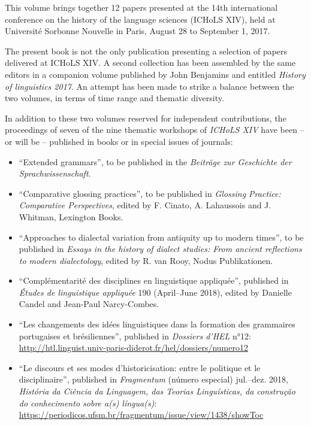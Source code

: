 \begin{refsection}

This volume brings together 12 papers presented at the 14th international conference on the history of the language sciences (ICHoLS XIV), held at Université Sorbonne Nouvelle in Paris, August 28 to September 1, 2017.

The present book is not the only publication presenting a selection of papers delivered at ICHoLS XIV. A second collection has been assembled by the same editors in a companion volume published by John Benjamins and entitled \emph{History of linguistics 2017}. An attempt has been made to strike a balance between the two volumes, in terms of time range and thematic diversity.

In addition to these two volumes reserved for independent contributions, the proceedings of seven of the nine thematic workshops of \emph{ICHoLS XIV} have been -- or will be -- published in books or in special issues of journals:

\begin{itemize}
    \item ``Extended grammars'', to be published in the \emph{Beiträge zur Geschichte der Sprachwissenschaft}.
    
    \item ``Comparative glossing practices'', to be published in \emph{Glossing Practice: Comparative Perspectives}, edited by F. Cinato, A. Lahaussois and J. Whitman, Lexington Books.
    
    \item ``Approaches to dialectal variation from antiquity up to modern times'', to be published in \emph{Essays in the history of dialect studies: From ancient reflections to modern dialectology}, edited by R. van Rooy, Nodus Publikationen.
    
    \item ``Complémentarité des disciplines en linguistique appliquée'', published in \emph{Études de linguistique appliquée} 190 (April--June 2018), edited by Danielle Candel and Jean-Paul Narcy-Combes.
    
    \item ``Les changements des idées linguistiques dans la formation des grammaires portugaises et brésiliennes'', published in \emph{Dossiers d'HEL} n°12: \url{http://htl.linguist.univ-paris-diderot.fr/hel/dossiers/numero12}
    
    \item ``Le discours et ses modes d’historicisation: entre le politique et le disciplinaire'', published in \emph{Fragmentum} (número especial) jul.--dez. 2018, \emph{História da Ciência da Linguagem, das Teorias Linguísticas, da construção do conhecimento sobre a(s) língua(s)}: \url{https://periodicos.ufsm.br/fragmentum/issue/view/1438/showToc}
    

\end{itemize}
\end{refsection}
